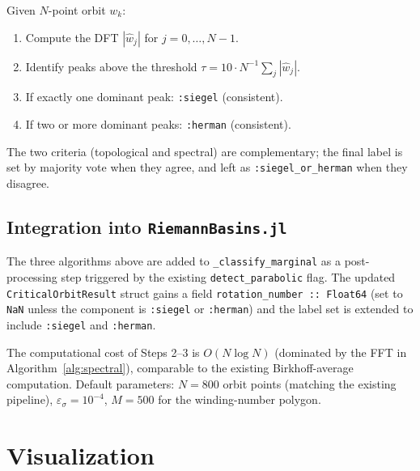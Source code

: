 \documentclass[12pt,a4paper]{article}
\begin{document}
\begin{algorithm}
  \caption{Spectral frequency count}
  \label{alg:spectral}
  Given $N$-point orbit $w_k$:
  \begin{enumerate}
    \item Compute the DFT $|\hat{w}_j|$ for $j = 0,\ldots,N-1$.
    \item Identify peaks above the threshold
          $\tau = 10 \cdot N^{-1}\sum_j|\hat{w}_j|$.
    \item If exactly one dominant peak: \texttt{:siegel} (consistent).
    \item If two or more dominant peaks: \texttt{:herman} (consistent).
  \end{enumerate}
\end{algorithm}

The two criteria (topological and spectral) are complementary; the final
label is set by majority vote when they agree, and left as
\texttt{:siegel\_or\_herman} when they disagree.

\subsection{Integration into \texttt{RiemannBasins.jl}}
\label{ssec:integration}

The three algorithms above are added to \texttt{\_classify\_marginal} as
a post-processing step triggered by the existing \texttt{detect\_parabolic}
flag.
The updated \texttt{CriticalOrbitResult} struct gains a field
\texttt{rotation\_number :: Float64} (set to \texttt{NaN} unless the
component is \texttt{:siegel} or \texttt{:herman}) and the label set
is extended to include \texttt{:siegel} and \texttt{:herman}.

The computational cost of Steps 2--3 is $O(N\log N)$ (dominated by the FFT
in Algorithm~\ref{alg:spectral}), comparable to the existing Birkhoff-average
computation.
Default parameters: $N = 800$ orbit points (matching the existing pipeline),
$\varepsilon_\sigma = 10^{-4}$, $M = 500$ for the winding-number polygon.

\section{Visualization}
\label{sec:visualization}
\end{document}

